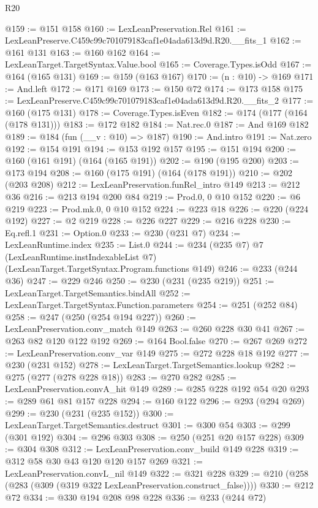 \begin{lexlean}{R20}
\begin{coremodule}
@159 := @151 @158
@160 := LexLeanPreservation.Rel
@161 := LexLeanPreserve.C459c99c701079183caf1e04ada613d9d.R20.__fits_1
@162 := @161 @131
@163 := @160 @162
@164 := LexLeanTarget.TargetSyntax.Value.bool
@165 := Coverage.Types.isOdd
@167 := @164 (@165 @131)
@169 := @159 (@163 @167)
@170 := (n : @10) -> @169
@171 := And.left
@172 := @171 @169
@173 := @150 @72
@174 := @173 @158
@175 := LexLeanPreserve.C459c99c701079183caf1e04ada613d9d.R20.__fits_2
@177 := @160 (@175 @131)
@178 := Coverage.Types.isEven
@182 := @174 (@177 (@164 (@178 @131)))
@183 := @172 @182
@184 := Nat.rec.{0}
@187 := And @169 @182
@189 := @184 (fun (__v : @10) => @187)
@190 := And.intro
@191 := Nat.zero
@192 := @154 @191
@194 := @153 @192 @157
@195 := @151 @194
@200 := @160 (@161 @191) (@164 (@165 @191))
@202 := @190 (@195 @200)
@203 := @173 @194
@208 := @160 (@175 @191) (@164 (@178 @191))
@210 := @202 (@203 @208)
@212 := LexLeanPreservation.funRel_intro @149
@213 := @212 @36
@216 := @213 @194 @200 @84
@219 := Prod.{0, 0} @10 @152
@220 := @6 @219
@223 := Prod.mk.{0, 0} @10 @152
@224 := @223 @18
@226 := @220 (@224 @192)
@227 := @2 @219
@228 := @226 @227
@229 := @216 @228
@230 := Eq.refl.{1}
@231 := Option.{0}
@233 := @230 (@231 @7)
@234 := LexLeanRuntime.index
@235 := List.{0}
@244 := @234
    (@235 @7)
    @7
    (LexLeanRuntime.instIndexableList @7)
    (LexLeanTarget.TargetSyntax.Program.functions @149)
@246 := @233 (@244 @36)
@247 := @229 @246
@250 := @230 (@231 (@235 @219))
@251 := LexLeanTarget.TargetSemantics.bindAll
@252 := LexLeanTarget.TargetSyntax.Function.parameters
@254 := @251 (@252 @84)
@258 := @247 (@250 (@254 @194 @227))
@260 := LexLeanPreservation.conv_match @149
@263 := @260 @228 @30 @41
@267 := @263 @82 @120 @122 @192
@269 := @164 Bool.false
@270 := @267 @269
@272 := LexLeanPreservation.conv_var @149
@275 := @272 @228 @18 @192
@277 := @230 (@231 @152)
@278 := LexLeanTarget.TargetSemantics.lookup
@282 := @275 (@277 (@278 @228 @18))
@283 := @270 @282
@285 := LexLeanPreservation.convA_hit @149
@289 := @285 @228 @192 @54 @20
@293 := @289 @61 @81 @157 @228
@294 := @160 @122
@296 := @293 (@294 @269)
@299 := @230 (@231 (@235 @152))
@300 := LexLeanTarget.TargetSemantics.destruct
@301 := @300 @54
@303 := @299 (@301 @192)
@304 := @296 @303
@308 := @250 (@251 @20 @157 @228)
@309 := @304 @308
@312 := LexLeanPreservation.conv_build @149 @228
@319 := @312 @58 @30 @43 @120 @120 @157 @269
@321 := LexLeanPreservation.convL_nil @149
@322 := @321 @228
@329 := @210 (@258 (@283 (@309 (@319 @322 LexLeanPreservation.construct_false))))
@330 := @212 @72
@334 := @330 @194 @208 @98 @228
@336 := @233 (@244 @72)

\end{coremodule}
\end{lexlean}
